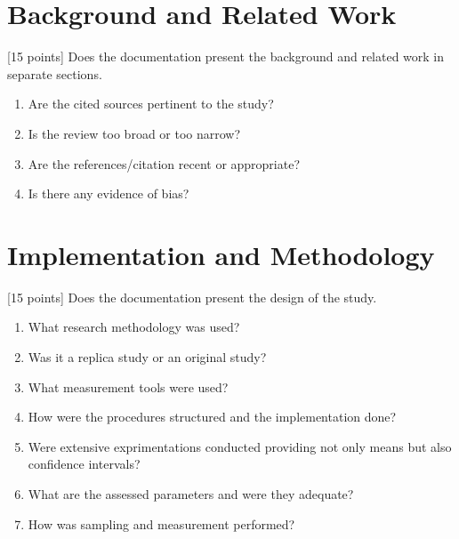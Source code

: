 \documentclass[letterpaper,10pt,english]{sphinxmanual}
\begin{document}
\section{Background and Related Work}
\label{\detokenize{docs/rubric:background-and-related-work}}
\sphinxAtStartPar
{[}15 points{]} Does the documentation present the background and related work in separate sections.
\begin{enumerate}
%
\item {} 
\sphinxAtStartPar
Are the cited sources pertinent to the study?

\item {} 
\sphinxAtStartPar
Is the review too broad or too narrow?

\item {} 
\sphinxAtStartPar
Are the references/citation recent or appropriate?

\item {} 
\sphinxAtStartPar
Is there any evidence of bias?

\end{enumerate}


\section{Implementation and Methodology}
\label{\detokenize{docs/rubric:implementation-and-methodology}}
\sphinxAtStartPar
{[}15 points{]} Does the documentation present the design of the study.
\begin{enumerate}
%
\item {} 
\sphinxAtStartPar
What research methodology was used?

\item {} 
\sphinxAtStartPar
Was it a replica study or an original study?

\item {} 
\sphinxAtStartPar
What measurement tools were used?

\item {} 
\sphinxAtStartPar
How were the procedures structured and the implementation done?

\item {} 
\sphinxAtStartPar
Were extensive exprimentations conducted providing not only means but also confidence intervals?

\item {} 
\sphinxAtStartPar
What are the assessed parameters and were they adequate?

\item {} 
\sphinxAtStartPar
How was sampling and measurement performed?

\end{enumerate}
\end{document}
